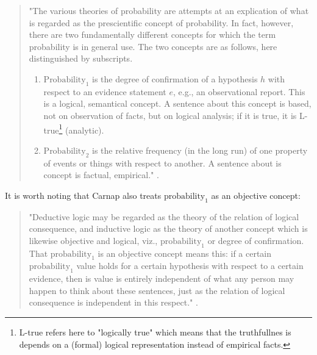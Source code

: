 \documentclass[
]{report}
\theoremstyle{definition}
\begin{document}
\begin{quote}
"The various theories of probability are attempts at an explication of what is regarded as the prescientific concept of probability. In fact, however, there are two fundamentally different concepts for which the term probability is in general use. The two concepts are as follows, here distinguished by subscripts.
\begin{enumerate}[label=(\arabic*)]
  \item $\text{Probability}_1$ is the degree of confirmation of a hypothesis $h$ with respect to an evidence statement $e$, e.g., an observational report. This is a logical, semantical concept. A sentence about this concept is based, not on observation of facts, but on logical analysis; if it is true, it is L-true\footnote{L-true refers here to "logically true" which means that the truthfullnes is depends on a (formal) logical representation instead of empirical facts.} (analytic).
  \item $\text{Probability}_2$ is the relative frequency (in the long run) of one property of events or things with respect to another. A sentence about is concept is factual, empirical." \cite[p.19]{carnap_logical_1950}.
\end{enumerate}
\end{quote}

It is worth noting that Carnap also treats \(\text{probability}_1\) as
an objective concept:

\begin{quote}
"Deductive logic may be regarded as the theory of the relation of logical consequence, and inductive logic as the theory of another concept which is likewise objective and logical, viz., $\text{probability}_1$ or degree of confirmation. That $\text{probability}_1$ is an objective concept means this: if a certain $\text{probability}_1$ value holds for a certain hypothesis with respect to a certain evidence, then is value is entirely independent of what any person may happen to think about these sentences, just as the relation of logical consequence is independent in this respect." \cite[p.43]{carnap_logical_1950}.
\end{quote}
\end{document}

